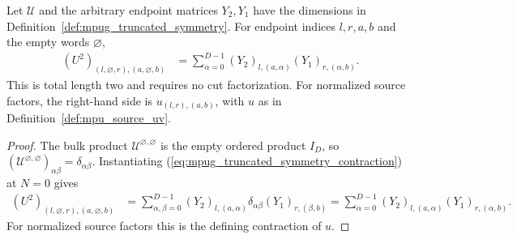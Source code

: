 \begin{lemma}
    \label{thm:mpug_truncated_symmetry_zero}
    \leanok
    Let $\mathcal U$ and the arbitrary endpoint matrices $Y_2,Y_1$ have
    the dimensions in Definition~\ref{def:mpug_truncated_symmetry}.
    For endpoint indices $l,r,a,b$ and the empty words $\varnothing$,
    \begin{align}
        (U^2)_{(l,\varnothing,r),(a,\varnothing,b)}
         & =\sum_{\alpha=0}^{D-1}
        (Y_2)_{l,(a,\alpha)}(Y_1)_{r,(\alpha,b)}.
        \label{eq:mpug_truncated_symmetry_zero}
    \end{align}
    This is total length two and requires no cut factorization.
    For normalized source factors,
    the right-hand side is $u_{(l,r),(a,b)}$, with $u$ as in
    Definition~\ref{def:mpu_source_uv}.
\end{lemma}
\begin{proof}\leanok
    The bulk product $\mathcal U^{\varnothing,\varnothing}$ is the empty
    ordered product $I_D$, so $(\mathcal U^{\varnothing,\varnothing})_{\alpha\beta}
        =\delta_{\alpha\beta}$. Instantiating
    (\ref{eq:mpug_truncated_symmetry_contraction}) at $N=0$ gives
    \begin{align}
        (U^2)_{(l,\varnothing,r),(a,\varnothing,b)}
         & =\sum_{\alpha,\beta=0}^{D-1}(Y_2)_{l,(a,\alpha)}
        \delta_{\alpha\beta}(Y_1)_{r,(\beta,b)}
        =\sum_{\alpha=0}^{D-1}(Y_2)_{l,(a,\alpha)}(Y_1)_{r,(\alpha,b)}.
    \end{align}
    For normalized source factors this is the defining contraction of $u$.
\end{proof}

